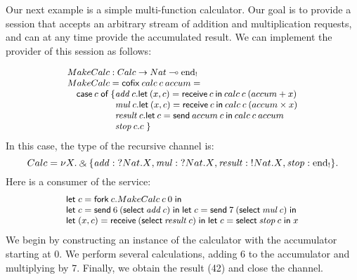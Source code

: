 \documentclass[orivec,envcountsame]{llncs}
\makeatletter
\newcommand{\with}{\mathbin\binampersand}
\newcommand{\gvout}[2]{{!#1.#2}}
\newcommand{\gvin}[2]{{?#1.#2}}
\newcommand{\lto}{\ensuremath{\multimap}}
\newcommand{\uto}{\ensuremath{\rightarrow}}
\newcommand{\outterm}{\mathrm{end}_!}
\newcommand{\interm}{\mathrm{end}_?}
\newcommand{\mkwd}[1]{\mathsf{#1}}
\newcommand{\tkwd}[1]{\textsf{#1}}
\newcommand{\clabel}[1]{\mathit{#1}}
\newcommand{\gvsend}[2]{\mkwd{send}\:#1\:#2}
\newcommand{\gvreceive}[1]{\mkwd{receive}\:#1}
\newcommand{\gvlet}[3]{\mkwd{let}\;#1 = #2\;\mkwd{in}\;#3}
\newcommand{\gvselect}[2]{\mkwd{select}\:#1\:#2}
\newcommand{\gvfork}[2]{\mkwd{fork}\:#1.#2}
\newcommand{\lrkwd}{\mkwd{cofix}}
\newcommand{\ba}{\begin{array}}
\newcommand{\ea}{\end{array}}
\newcommand{\bl}{\ba[t]{@{}l@{}}}
\newcommand{\el}{\ea}
\makeatother
\begin{document}
Our next example is a simple multi-function calculator. Our goal is to provide a session that
accepts an arbitrary stream of addition and multiplication requests, and can at any time provide the
accumulated result.  We can implement the provider of this session as follows:

\[\small
\bl
MakeCalc : Calc \uto Nat \lto \outterm \\
MakeCalc = \lrkwd\:calc\:c\:accum = \\
\quad
  \bl
  \mkwd{case}\:c\;\mkwd{of}\:\{
    \bl
    \clabel{add}\:c.
      \bl
      \mkwd{let}\:(x,c) = \gvreceive{c} \: \mkwd{in}\:
      calc\:c\:(accum + x) \\
      \el \\
    \clabel{mul}\:c.
      \bl
      \mkwd{let}\:(x,c) = \gvreceive{c}\:\mkwd{in}\:
      calc\:c\:(accum \times x) \\
      \el \\
    \clabel{result}\:c.
      \bl
      \mkwd{let}\:c = \gvsend{accum}{c}\:\mkwd{in}\:
      calc\:c\:accum \\
      \el \\
    \clabel{stop}\:c.c \; \}
    \el \\
  \el \\
\el
\]
In this case, the type of the recursive channel is:
\[\small
 Calc = \nu X. \with \{ \clabel{add}: \gvin{Nat}{X},
                        \clabel{mul}: \gvin{Nat}{X},
                        \clabel{result}: \gvout{Nat}{X},
                        \clabel{stop}: \outterm \}.
\]%
Here is a consumer of the service:
\[\small
\bl
  \gvlet{c}{\gvfork{c}{MakeCalc\:c\:0}}{} \\
  \gvlet{c}{\gvsend{6}{(\gvselect{\clabel{add}}{c})}}{
  \gvlet{c}{\gvsend{7}{(\gvselect{\clabel{mul}}{c})}}{}} \\
  \gvlet{(x,c)}{\gvreceive{(\gvselect{\clabel{result}}{c})}}{
  \gvlet{c}{\gvselect{\clabel{stop}}{c}}{x}}
\el
\]
We begin by constructing an instance of the calculator with the accumulator starting at 0. %
We perform several calculations, adding 6 to the accumulator and multiplying by 7.  Finally, we
obtain the result (42) and close the channel.
\end{document}
